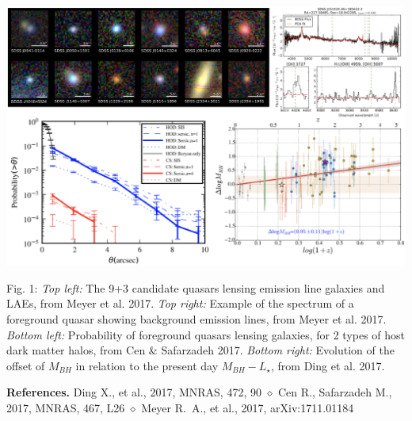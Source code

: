 \documentclass[a4paper,11pt]{article}
\begin{document}
\begin{minipage}{\textwidth}
\includegraphics[width=0.95\hsize]{collage.eps}
\end{minipage}
Fig. 1: {\it Top left:} The 9+3 candidate quasars lensing emission line galaxies and LAEs, from Meyer et al. 2017. {\it Top right:} Example of the spectrum of a foreground quasar showing background emission lines, from Meyer et al. 2017. {\it Bottom left:} Probability of foreground quasars lensing galaxies, for 2 types of host dark matter halos, from Cen \& Safarzadeh 2017. {\it Bottom right:} Evolution of the offset of $M_{BH}$ in relation to the present day $M_{BH} - L_{\star}$, from Ding et al. 2017. 
  
\medskip
  
{\bf References.} Ding X., et al., 2017, MNRAS, 472, 90 $\diamond$ Cen R., Safarzadeh M., 2017, MNRAS, 467, L26 $\diamond$ Meyer R.~A., et al., 2017, arXiv:1711.01184
\end{document}
